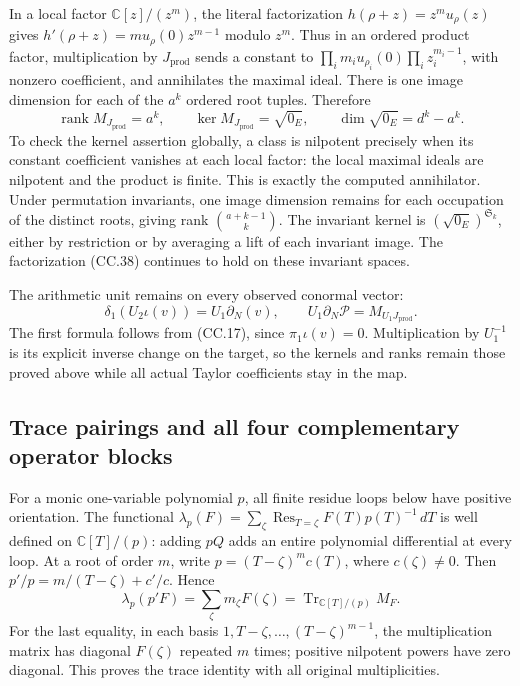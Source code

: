In a local factor \(\mathbb C[z]/(z^m)\), the literal factorization
\(h(\rho+z)=z^m u_\rho(z)\) gives
\(h'(\rho+z)=m u_\rho(0)z^{m-1}\) modulo \(z^m\).
Thus in an ordered product factor, multiplication by
\(J_{\mathrm{prod}}\) sends a constant to
\(\prod_i m_i u_{\rho_i}(0)\prod_i z_i^{m_i-1}\),
with nonzero coefficient, and annihilates the maximal ideal.
There is one image dimension for each of the \(a^k\) ordered root
tuples.  Therefore
\[
 \operatorname{rank}M_{J_{\mathrm{prod}}}=a^k,
 \qquad \ker M_{J_{\mathrm{prod}}}=\sqrt{0_E},
 \qquad \dim\sqrt{0_E}=d^k-a^k.
 \tag{CC.39}
\]
To check the kernel assertion globally, a class is nilpotent precisely
when its constant coefficient vanishes at each local factor:
the local maximal ideals are nilpotent and the product is finite.
This is exactly the computed annihilator.  Under permutation
invariants, one image dimension remains for each occupation of
the distinct roots, giving rank \(\binom{a+k-1}{k}\).
The invariant kernel is \((\sqrt{0_E})^{\mathfrak S_k}\), either
by restriction or by averaging a lift of each invariant image.
The factorization (CC.38) continues to hold on these invariant spaces.

The arithmetic unit remains on every observed conormal vector:
\[
 \delta_1(U_2\iota(v))=U_1\partial_N(v),\qquad
 U_1\partial_N\mathcal P=M_{U_1J_{\mathrm{prod}}}.
 \tag{CC.40}
\]
The first formula follows from (CC.17), since
\(\pi_1\iota(v)=0\).  Multiplication by \(U_1^{-1}\)
is its explicit inverse change on the target, so the kernels
and ranks remain those proved above while all actual Taylor
coefficients stay in the map.

\subsection{Trace pairings and all four complementary operator blocks}

For a monic one-variable polynomial \(p\), all finite residue loops
below have positive orientation.  The functional
\(\lambda_p(F)=\sum_\zeta\operatorname{Res}_{T=\zeta}
F(T)p(T)^{-1}\,dT\) is well defined on \(\mathbb C[T]/(p)\):
adding \(pQ\) adds an entire polynomial differential at every loop.
At a root of order \(m\), write \(p=(T-\zeta)^m c(T)\),
where \(c(\zeta)\ne0\).  Then
\(p'/p=m/(T-\zeta)+c'/c\).  Hence
\[
 \lambda_p(p'F)=\sum_\zeta m_\zeta F(\zeta)
       =\operatorname{Tr}_{\mathbb C[T]/(p)}M_F.
 \tag{CC.41}
\]
For the last equality, in each basis
\(1,T-\zeta,\ldots,(T-\zeta)^{m-1}\), the multiplication
matrix has diagonal \(F(\zeta)\) repeated \(m\) times;
positive nilpotent powers have zero diagonal.  This proves the
trace identity with all original multiplicities.

